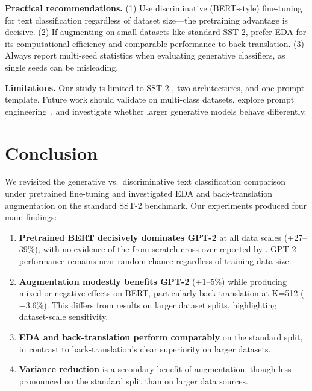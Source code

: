 \documentclass[11pt,a4paper,twocolumn]{article}
\begin{document}
\textbf{Practical recommendations.} (1) Use discriminative (BERT-style) fine-tuning for text classification regardless of dataset size---the pretraining advantage is decisive. (2) If augmenting on small datasets like standard SST-2, prefer EDA for its computational efficiency and comparable performance to back-translation. (3) Always report multi-seed statistics when evaluating generative classifiers, as single seeds can be misleading.

\textbf{Limitations.} Our study is limited to SST-2 , two architectures, and one prompt template. Future work should validate on multi-class datasets, explore prompt engineering~\cite{zhao2021}, and investigate whether larger generative models behave differently.

\section{Conclusion}

We revisited the generative vs.\ discriminative text classification comparison under pretrained fine-tuning and investigated EDA and back-translation augmentation on the standard SST-2 benchmark. Our experiments produced four main findings:

\begin{enumerate}
    \setlength\itemsep{0pt}
    \item \textbf{Pretrained BERT decisively dominates GPT-2} at all data scales (+27--39\%), with no evidence of the from-scratch cross-over reported by \cite{kasa2025}. GPT-2 performance remains near random chance regardless of training data size.
    \item \textbf{Augmentation modestly benefits GPT-2} (+1--5\%) while producing mixed or negative effects on BERT, particularly back-translation at K=512 ($-$3.6\%). This differs from results on larger dataset splits, highlighting dataset-scale sensitivity.
    \item \textbf{EDA and back-translation perform comparably} on the standard split, in contrast to back-translation's clear superiority on larger datasets.
    \item \textbf{Variance reduction} is a secondary benefit of augmentation, though less pronounced on the standard split than on larger data sources.
\end{enumerate}
\end{document}
